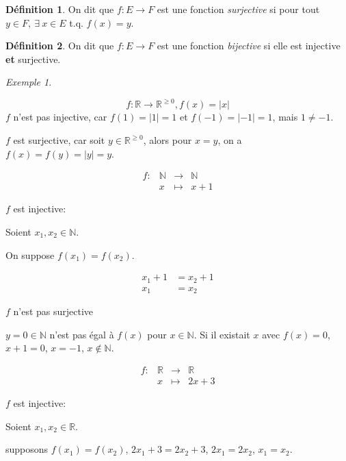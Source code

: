 \documentclass{report}
\newcommand*{\abs}[1]{\left| #1 \right|}
\newcommand*{\gte}{\geqslant}
\newcommand*{\reels}{\mathbb{R}}
\newcommand*{\naturels}{\mathbb{N}}
\theoremstyle{definition}
\newtheorem*{defin}{D\'efinition}
\theoremstyle{remark}
\newtheorem*{exem}{Exemple}
\begin{document}
	\begin{defin}
		On dit que $f:E \to F$ est une fonction \emph{surjective} si pour tout $y \in F,~\exists~x \in E$ t.q. $f(x)=y$.
	\end{defin}

	\begin{defin}
		On dit que $f:E \to F$ est une fonction \emph{bijective} si elle est injective \textbf{et} surjective.
	\end{defin}

	\begin{exem}~

		\begin{ulist}
			\item
			\[
			f:\reels \to \reels^{\gte0}, f(x)=\abs{x}
			\]
			$f$ n'est pas injective, car $f(1)=\abs{1}=1$ et $f(-1)=\abs{-1}=1$, mais $1 \neq -1$.

			$f$ est surjective, car soit $y \in \reels^{\gte0}$, alors pour $x=y$, on a $f(x)=f(y)=\abs{y}=y$.

			\item
			\[
			\begin{array}{rrcl}
				f:&\naturels&\to&\naturels\\
				&x&\mapsto&x+1
			\end{array}
			\]

			$f$ est injective:

			Soient $x_1,x_2 \in \naturels$.

			On suppose $f(x_1)=f(x_2)$.

			\begin{align*}
				x_1+1&= x_2+1\\
				x_1&= x_2
			\end{align*}

			$f$ n'est pas surjective

			$y=0\in\naturels$ n'est pas \'egal \`a $f(x)$ pour $x\in\naturels$. Si il existait $x$ avec $f(x)=0$, $x+1=0$, $x=-1$, $x \not\in \naturels$.

			\item
			\[
			\begin{array}{rrcl}
				f:&\reels&\to&\reels\\
				&x&\mapsto&2x+3
			\end{array}
			\]

			$f$ est injective:

			Soient $x_1,x_2 \in \reels$.

			supposons $f(x_1)=f(x_2)$, $2x_1+3=2x_2+3$, $2x_1=2x_2$, $x_1=x_2$.


\end{ulist}
\end{exem}
\end{document}
